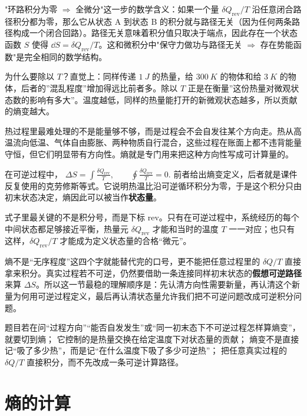 \documentclass[lang=cn,11pt]{elegantbook}
\newcommand{\bridge}[1]{\begin{note}#1\end{note}}
\begin{document}
\begin{remark}
"环路积分为零 \(\Rightarrow\) 全微分"这一步的数学含义：如果一个量 \(\delta Q_{\mathrm{rev}}/T\) 沿任意闭合路径积分都为零，那么它从状态 A 到状态 B 的积分就与路径无关（因为任何两条路径构成一个闭合回路）。路径无关意味着积分值只取决于端点，因此存在一个状态函数 \(S\) 使得 \(\dd S=\delta Q_{\mathrm{rev}}/T\)。这和微积分中"保守力做功与路径无关 \(\Rightarrow\) 存在势能函数"是完全相同的数学结构。
\end{remark}

\bridge{为什么要除以 \(T\)？直觉上：同样传递 \(\SI{1}{J}\) 的热量，给 \(\SI{300}{K}\) 的物体和给 \(\SI{3}{K}\) 的物体，后者的”混乱程度”增加得远比前者多。除以 \(T\) 正是在衡量”这份热量对微观状态数的影响有多大”。温度越低，同样的热量能打开的新微观状态越多，所以贡献的熵变越大。}

 热过程里最难处理的不是能量够不够，而是过程会不会自发往某个方向走。热从高温流向低温、气体自由膨胀、两种物质自行混合，这些过程在账面上都不违背能量守恒，但它们明显带有方向性。熵就是专门用来把这种方向性写成可计算量的。

 在可逆过程中，
 \(\Delta S=\int \frac{\delta Q_{\mathrm{rev}}}{T},\qquad \oint \frac{\delta Q_{\mathrm{rev}}}{T}=0.\) 
前者给出熵变定义，后者就是课件反复使用的克劳修斯等式。它说明热温比沿可逆循环积分为零，于是这个积分只由初末状态决定，熵因此可以被当作\textbf{状态量}。

 式子里最关键的不是积分号，而是下标 \(\mathrm{rev}\)。只有在可逆过程中，系统经历的每个中间状态都足够接近平衡，热量元 \(\delta Q_{\mathrm{rev}}\) 才能和当时的温度 \(T\) 一一对应；也只有这样，\(\delta Q_{\mathrm{rev}}/T\) 才能成为定义状态量的合格“微元”。

 熵不是“无序程度”这四个字就能替代完的口号，更不能把任意过程里的 \(\delta Q/T\) 直接拿来积分。真实过程若不可逆，仍然要借助一条连接同样初末状态的\textbf{假想可逆路径}来算 \(\Delta S\)。所以这一节最稳的理解顺序是：先认清方向性需要新量，再认清这个新量为何用可逆过程定义，最后再认清状态量允许我们把不可逆问题改成可逆积分问题。

\begin{note}
 题目若在问“过程方向”“能否自发发生”或“同一初末态下不可逆过程怎样算熵变”，就要切到熵； 它控制的是热量交换在给定温度下对状态量的贡献； 熵变不是直接记“吸了多少热”，而是记“在什么温度下吸了多少可逆热”； 把任意真实过程的 \(\delta Q/T\) 直接积分，而不先改成一条可逆计算路径。
\end{note}

\section{熵的计算}
\end{document}
